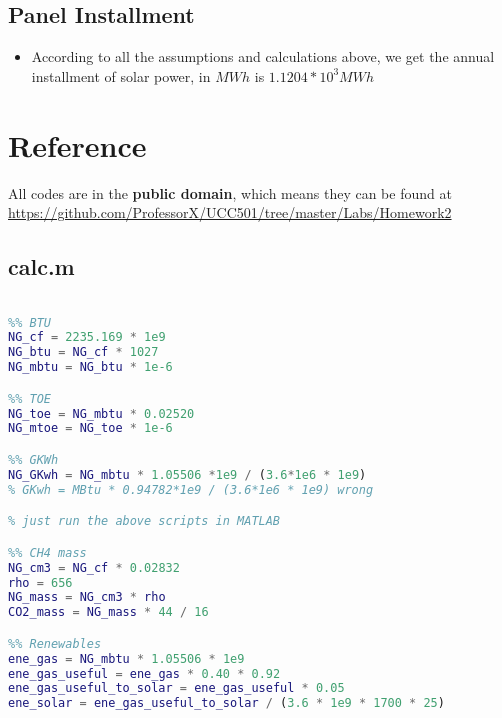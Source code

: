 \documentclass[12pt]{article}
\begin{document}
\subsection{Panel Installment}
\label{sec:panel-installment}

\begin{itemize}
\item According to all the assumptions and calculations above, we get
  the annual installment of solar power, in $MWh$ is $1.1204*10^{3}MWh$
\end{itemize}

\section{Reference}
\label{sec:reference}

All codes are in the \textbf{public domain}, which means they can be
found at
\url{https://github.com/ProfessorX/UCC501/tree/master/Labs/Homework2} 
\subsection{calc.m}
\label{sec:question-1-1}

\begin{lstlisting}[language=Matlab]
% UCC501 HW2 Calc

%% BTU
NG_cf = 2235.169 * 1e9
NG_btu = NG_cf * 1027
NG_mbtu = NG_btu * 1e-6

%% TOE
NG_toe = NG_mbtu * 0.02520
NG_mtoe = NG_toe * 1e-6

%% GKWh
NG_GKwh = NG_mbtu * 1.05506 *1e9 / (3.6*1e6 * 1e9)
% GKwh = MBtu * 0.94782*1e9 / (3.6*1e6 * 1e9) wrong

% just run the above scripts in MATLAB

%% CH4 mass
NG_cm3 = NG_cf * 0.02832
rho = 656
NG_mass = NG_cm3 * rho
CO2_mass = NG_mass * 44 / 16

%% Renewables
ene_gas = NG_mbtu * 1.05506 * 1e9
ene_gas_useful = ene_gas * 0.40 * 0.92
ene_gas_useful_to_solar = ene_gas_useful * 0.05
ene_solar = ene_gas_useful_to_solar / (3.6 * 1e9 * 1700 * 25)



\end{lstlisting}


\end{document}
